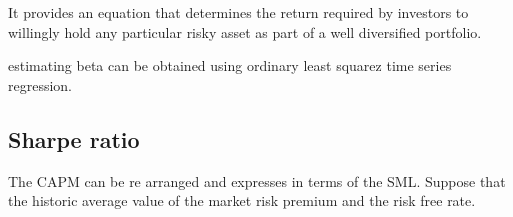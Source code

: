 It provides an equation that determines the return required by investors to willingly hold any particular risky asset as part of a well diversified portfolio.

 estimating beta
 can be obtained using ordinary least squarez time series regression.



\subsection*{Sharpe ratio}

The CAPM can be re arranged and expresses in terms of the SML. Suppose that the historic average value of the market risk premium and the risk free rate.

